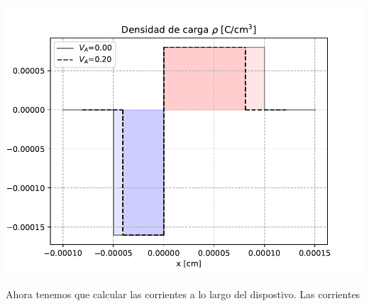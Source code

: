 \begin{enumerate}[label=\alph*)]
\begin{center}
        \end{center}
        \begin{center}
            \includegraphics[width=0.6\linewidth]{Cuerpo/Ch_03/03_06_rho.pdf}
        \end{center}
        Ahora tenemos que calcular las corrientes a lo largo del dispostivo. Las corrientes
    \end{enumerate}
